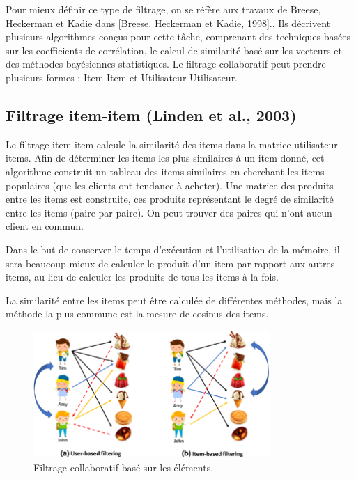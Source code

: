 Pour mieux définir ce type de filtrage, on se réfère aux travaux de Breese, Heckerman et Kadie dans [Breese, Heckerman et Kadie, 1998].. Ils décrivent plusieurs algorithmes conçus pour cette tâche, comprenant des techniques basées sur les coefficients de corrélation, le calcul de similarité basé sur les vecteurs et des méthodes bayésiennes statistiques. Le filtrage collaboratif peut prendre plusieurs formes : Item-Item et Utilisateur-Utilisateur.


\subsection{Filtrage item-item (Linden et al., 2003)}

Le filtrage item-item calcule la similarité des items dans la matrice utilisateur-items. Afin de déterminer les items les plus similaires à un item donné, cet algorithme construit un tableau des items similaires en cherchant les items populaires (que les clients ont tendance à acheter). Une matrice des produits entre les items est construite, ces produits représentant le degré de similarité entre les items (paire par paire). On peut trouver des paires qui n'ont aucun client en commun.

Dans le but de conserver le temps d'exécution et l'utilisation de la mémoire, il sera beaucoup mieux de calculer le produit d'un item par rapport aux autres items, au lieu de calculer les produits de tous les items à la fois.

La similarité entre les items peut être calculée de différentes méthodes, mais la méthode la plus commune est la mesure de cosinus des items.
\begin{figure}[h]
        \centering
        \includegraphics[width=0.8\textwidth]{images/item tem filtrage.png}
        \caption{Filtrage collaboratif basé sur les éléments.}
        \label{fig:classification}
\end{figure}

